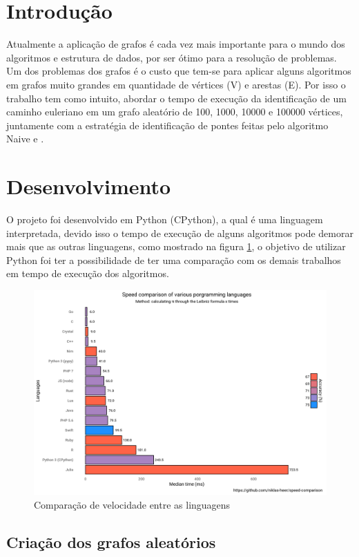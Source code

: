 \section{\esp Introdução}

Atualmente a aplicação de grafos é cada vez mais importante para o mundo dos algoritmos e estrutura de dados, por ser ótimo para a resolução de problemas. Um dos problemas dos grafos é o custo que tem-se para aplicar alguns algoritmos em grafos muito grandes em quantidade de vértices (V) e arestas (E). Por isso o trabalho tem como intuito, abordar o tempo de execução da identificação de um caminho euleriano em um grafo aleatório de 100, 1000, 10000 e 100000 vértices, juntamente com a estratégia de identificação de pontes feitas pelo algoritmo Naive e \cite{tarjan}. 

\section{\esp Desenvolvimento}
O projeto foi desenvolvido em Python (CPython), a qual é uma linguagem interpretada, devido isso o tempo de execução de alguns algoritmos pode demorar mais que as outras linguagens, como mostrado na figura \ref{fig:figure1}, o objetivo de utilizar Python foi ter a possibilidade de ter uma comparação com os demais trabalhos em tempo de execução dos algoritmos.

\begin{figure}[ht]
    \centering
    \includegraphics[width=.9\textwidth]{figuras/speed-comparision-programming.png}
    \caption{Comparação de velocidade entre as linguagens}
    \label{fig:figure1}
\end{figure}

\subsection{\esp Criação dos grafos aleatórios}
